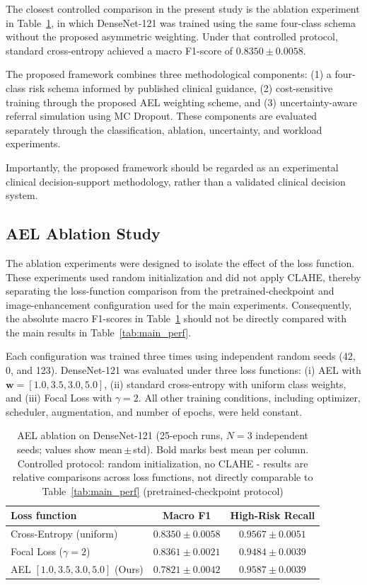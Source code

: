 \documentclass[11pt,a4paper]{article}
\begin{document}
The closest controlled comparison in the present study is the ablation
experiment in Table~\ref{tab:ablation}, in which DenseNet-121 was trained
using the same four-class schema without the proposed asymmetric weighting.
Under that controlled protocol, standard cross-entropy achieved a macro
F1-score of $0.8350\pm0.0058$.

The proposed framework combines three methodological components: (1) a
four-class risk schema informed by published clinical guidance, (2)
cost-sensitive training through the proposed AEL weighting scheme, and
(3) uncertainty-aware referral simulation using MC Dropout. These components
are evaluated separately through the classification, ablation, uncertainty,
and workload experiments.

Importantly, the proposed framework should be regarded as an
experimental clinical decision-support methodology, rather than a
validated clinical decision system.

\subsection{AEL Ablation Study}
\label{sec:ablation}

The ablation experiments were designed to isolate the effect of the loss
function. These experiments used random initialization and did not apply
CLAHE, thereby separating the loss-function comparison from the
pretrained-checkpoint and image-enhancement configuration used for the main
experiments. Consequently, the absolute macro F1-scores in
Table~\ref{tab:ablation} should not be directly compared with the main
results in Table~\ref{tab:main_perf}.

Each configuration was trained three times using independent random seeds
(42, 0, and 123). DenseNet-121 was evaluated under three loss functions:
(i) AEL with $\mathbf{w}=[1.0, 3.5, 3.0, 5.0]$, (ii) standard
cross-entropy with uniform class weights, and (iii) Focal Loss with
$\gamma=2$. All other training conditions, including optimizer, scheduler,
augmentation, and number of epochs, were held constant.

\begin{table}[H]
\centering
\caption{AEL ablation on DenseNet-121 (25-epoch runs, $N=3$ independent
  seeds; values show mean\,$\pm$\,std). Bold marks best mean per column.
  Controlled protocol: random initialization, no CLAHE - results are
  relative comparisons across loss functions, not directly comparable to
  Table~\ref{tab:main_perf} (pretrained-checkpoint protocol)}
\label{tab:ablation}
\begin{tabular}{lcc}
\toprule
\textbf{Loss function} & \textbf{Macro F1} & \textbf{High-Risk Recall}\\
\midrule
Cross-Entropy (uniform)              & $0.8350 \pm 0.0058$          & $0.9567 \pm 0.0051$\\
Focal Loss ($\gamma=2$)              & \textbf{$0.8361 \pm 0.0021$} & $0.9484 \pm 0.0039$\\
AEL $[1.0, 3.5, 3.0, 5.0]$ (Ours)  & $0.7821 \pm 0.0042$          & \textbf{$0.9587 \pm 0.0039$}\\
\bottomrule
\end{tabular}
\end{table}
\end{document}
